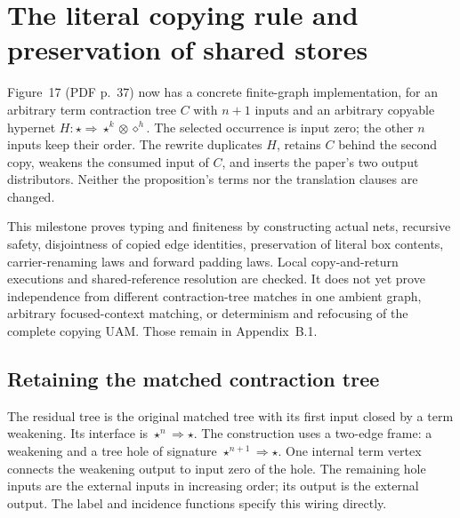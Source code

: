 \clearpage
\section{The literal copying rule and preservation of shared stores}
\label{sec:copying-rule}
Figure~17 (PDF p.~37) now has a concrete finite-graph implementation, for
an arbitrary term contraction tree $C$ with $n+1$ inputs and an arbitrary
copyable hypernet $H:\star\Rightarrow\star^k\otimes\diamond^h$.
The selected occurrence is input zero; the other $n$ inputs keep their order.
The rewrite duplicates $H$, retains $C$ behind the second copy, weakens the
consumed input of $C$, and inserts the paper's two output distributors.
Neither the proposition's terms nor the translation clauses are changed.

This milestone proves typing and finiteness by constructing actual nets,
recursive safety, disjointness of copied edge identities, preservation of
literal box contents, carrier-renaming laws and forward padding laws. Local
copy-and-return executions and shared-reference resolution are checked.
It does not yet prove independence from different contraction-tree matches
in one ambient graph, arbitrary focused-context matching, or determinism and
refocusing of the complete copying UAM. Those remain in Appendix~B.1.

\subsection{Retaining the matched contraction tree}

The residual tree is the original matched tree with its first input closed
by a term weakening. Its interface is $\star^n\Rightarrow\star$.
The construction uses a two-edge frame: a weakening and a tree hole of
signature $\star^{n+1}\Rightarrow\star$. One internal term vertex connects
the weakening output to input zero of the hole. The remaining hole inputs
are the external inputs in increasing order; its output is the external
output. The label and incidence functions specify this wiring directly.






